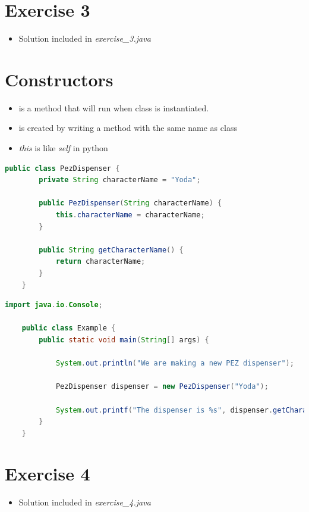 \documentclass[12pt]{article}
\begin{document}
\bigskip

\section{Exercise 3}

\bigskip

\begin{itemize}
    \item Solution included in \textit{exercise\_3.java}
\end{itemize}

\bigskip

\section{Constructors}

\bigskip

\begin{itemize}
    \item is a method that will run when class is instantiated.
    \item is created by writing a method with the same name as class
    \item \textit{this} is like \textit{self} in python
\end{itemize}


    \begin{lstlisting}[language=Java,caption={lesson\_9/PezDispenser.java}]
    public class PezDispenser {
        private String characterName = "Yoda";

        public PezDispenser(String characterName) {
            this.characterName = characterName;
        }

        public String getCharacterName() {
            return characterName;
        }
    }
    \end{lstlisting}

    \bigskip

    \begin{lstlisting}[language=Java,caption={lesson\_9/Example.java}]
    import java.io.Console;

    public class Example {
        public static void main(String[] args) {

            System.out.println("We are making a new PEZ dispenser");

            PezDispenser dispenser = new PezDispenser("Yoda");

            System.out.printf("The dispenser is %s", dispenser.getCharacterName()); // <- 2. And is used here
        }
    }
    \end{lstlisting}

\bigskip

\section{Exercise 4}

\bigskip

\begin{itemize}
    \item Solution included in \textit{exercise\_4.java}
\end{itemize}
\end{document}
